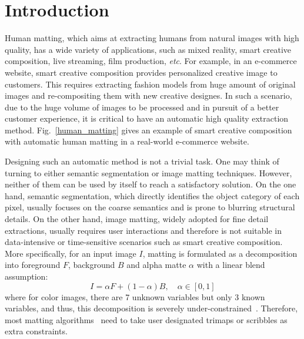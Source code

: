 \section{Introduction}




Human matting, which aims at extracting humans from natural images with high quality, has a wide variety of applications, such as mixed reality, smart creative composition, live streaming, film production, \emph{etc}.
For example, in an e-commerce website, smart creative composition provides personalized creative image to customers.
This requires extracting fashion models from huge amount of original images and re-compositing them with new creative designes.
In such a scenario, due to the huge volume of images to be processed and in pursuit of a better customer experience,
it is critical to have an automatic high quality extraction method.
Fig.~\ref{human_matting} gives an example of smart creative composition with automatic human matting in a real-world e-commerce website.

Designing such an automatic method is not a trivial task.
One may think of turning to either semantic segmentation or image matting techniques.
However, neither of them can be used by itself to reach a satisfactory solution.
On the one hand, semantic segmentation, which directly identifies the object category of each pixel, 
usually focuses on the coarse semantics and is prone to blurring structural details.
On the other hand, image matting, widely adopted for fine detail extractions, usually requires user interactions and therefore is not suitable in data-intensive or time-sensitive scenarios such as smart creative composition.
More specifically,
for an input image $I$, matting is formulated as a decomposition into foreground $F$, background $B$ and alpha matte $\alpha$ with a linear blend assumption:
\begin{equation}
\label{equa_composition}
I = \alpha F + (1-\alpha) B , \quad \alpha \in [0, 1]
\end{equation}
where for color images, there are 7 unknown variables but only 3 known variables, and thus, this decomposition is severely under-constrained~\cite{levin2008closed}.
Therefore, most matting algorithms~\cite{levin2008closed,chen2013knn,aksoy2017designing,xu2017deep} need to take user designated trimaps or scribbles as extra constraints.







